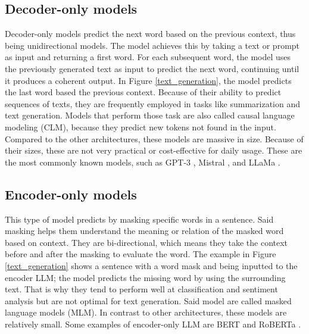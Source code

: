 \subsection{Decoder-only models}
Decoder-only models predict the next word based on the previous context, thus being unidirectional models. The model achieves this by taking a text or prompt as input and returning 
a first word. For each subsequent word, the model uses the previously generated text as input to predict the next word, continuing until it produces a coherent output. In Figure \ref{text_generation},
the model predicts the last word based the previous context. Because of their ability to predict sequences of texts, they are frequently employed in tasks like summarization and text generation. Models
that perform those task are also called causal language modeling (CLM), because they predict new tokens not found in the input. Compared to the other architectures, these models are massive
in size. Because of their sizes, these are not very practical or cost-effective for daily usage. These are the most commonly known models, such as GPT-3 \cite{DBLP:journals/corr/abs-2005-14165},
Mistral \cite{jiang2023mistral7b}, and LLaMa \cite{touvron2023llamaopenefficientfoundation}.

\subsection{Encoder-only models}
This type of model predicts by masking specific words in a sentence. Said masking helps them understand the meaning or relation of the masked word based on context. They are bi-directional,
which means they take the context before and after the masking to evaluate the word. The example in Figure \ref{text_generation} shows a sentence with a word mask and being inputted to
the encoder LLM; the model predicts the missing word by using the surrounding text. That is why they tend to perform well at classification and sentiment analysis but are not optimal for text
generation. Said model are called masked language models (MLM). In contrast to other architectures, these models are relatively small. Some examples of encoder-only LLM are BERT
\cite{DBLP:journals/corr/abs-1810-04805} and RoBERTa \cite{liu2019robertarobustlyoptimizedbert}.

